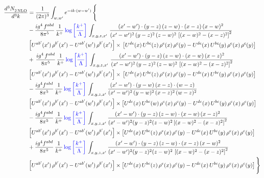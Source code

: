 \documentclass[9pt]{article}
\numberwithin{equation}{section}
\begin{document}
\begin{align}
   \frac{d^{3}N_{2\,\rm NLO}^{\rm}}{d^{3}k}  & = \frac{1}{(2\pi)^{3}}  \int_{w, w^\prime} e^{-ik\cdot (w-w')}\, \Bigg\{\notag \\ &  -\frac{ig^{4}\, f^{abd}}{8\pi^{5}}\, \frac{1}{k^{+}}\,{\color{blue}\log{\left[\frac{k^{+}}{\Lambda}\right]}}\, \int_{x,y,z,x'}\,\frac{(x'-w')\cdot  (y-z)\, (z-w)\cdot (x-z)\, (x-w)^{2}}{(x'-w')^{2}\, (y-z)^{2}\, (z-w)^{2}\,\left[(x-w)^{2}-(x-z)^{2}\right]^{2}}\, \notag \\ & \left[U^{ab'}(x')\,\rho^{b'}(x')-U^{ab'}(w')\, \rho^{b'}(x')\right]\times\,\left[U^{de}(x)\,U^{bc}(z)\, \rho^{e}(x)\,\rho^{c}(y)-U^{de}(x)\,U^{bc}(y)\,\rho^{e}(x)\,\rho^{c}(y)\right]\notag \\ &   +\, \frac{ig^{4}\, f^{abd}}{8\pi^{5}}\, \frac{1}{k^{+}}\,{\color{blue}\log{\left[\frac{k^{+}}{\Lambda}\right]}}\, \int_{x,y,z,x'}\,\frac{(x'-w')\cdot  (y-z)\, (z-w)\cdot (x-w)\, (x-z)^{2}}{(x'-w')^{2}\, (y-z)^{2}\, (z-w)^{2}\,\left[(x-w)^{2}-(x-z)^{2}\right]^{2}}\, \notag \\ & \left[U^{ab'}(x')\,\rho^{b'}(x')-U^{ab'}(w')\, \rho^{b'}(x')\right]\times\,\left[U^{de}(x)\,U^{bc}(z)\, \rho^{e}(x)\,\rho^{c}(y)-U^{de}(x)\,U^{bc}(y)\,\rho^{e}(x)\,\rho^{c}(y)\right]\notag \\ & -\frac{ig^{4}f^{abd}}{8\pi^{5}}\,\frac{1}{k^{+}}\,{\color{blue}\log{\left[\frac{k^{+}}{\Lambda}\right]}}\,\int_{x,y,z,x'}
\frac{(x'-w')\cdot (y-w)\, (x-z)\cdot (w-z)}{(x'-w')^{2}\, (y-w)^{2}\, (x-z)^{2}\, (w-z)^{2}}\notag \\ & \left[U^{ab'}(x')\,\rho^{b'}(x')-U^{ab'}(w')\, \rho^{b'}(x')\right]\times \left[U^{de}(x)\,U^{bc}(w)\, \rho^{e}(x)\,\rho^{c}(y)-U^{de}(x)\,U^{bc}(y)\,\rho^{e}(x)\,\rho^{c}(y)\right]\notag \\ & -\frac{ig^{4}f^{abd}}{8\pi^{5}}\,\frac{1}{k^{+}}\,{\color{blue}\log{\left[\frac{k^{+}}{\Lambda}\right]}}\,\int_{x,y,z,x'}
\frac{(x'-w')\cdot(y-z)\,(z-w)\cdot(x-w)\,(x-z)^{2}}{(x'-w')^{2}(y-z)^{2}(z-w)^{2}\left[(x-w)^{2}-(x-z)^{2}\right]^{2}}\notag \\ & \left[U^{ab'}(x')\,\rho^{b'}(x')-U^{ab'}(w')\, \rho^{b'}(x')\right]\times \left[U^{de}(x)\,U^{bc}(z)\, \rho^{e}(x)\,\rho^{c}(y)-U^{de}(x)\,U^{bc}(y)\,\rho^{e}(x)\,\rho^{c}(y)\right]\notag \\ & +\frac{ig^{4}f^{abd}}{8\pi^{5}}\,\frac{1}{k^{+}}\,{\color{blue}\log{\left[\frac{k^{+}}{\Lambda}\right]}}\,\int_{x,y,z,x'}
\frac{(x'-w')\cdot(y-z)\,(z-w)\cdot(x-z)\,(x-w)^{2}}{(x'-w')^{2}(y-z)^{2}(z-w)^{2}\,\left[(x-w)^{2}-(x-z)^{2}\right]^{2}}\notag \\ & \left[U^{ab'}(x')\,\rho^{b'}(x')-U^{ab'}(w')\, \rho^{b'}(x')\right]\times \left[U^{de}(x)\,U^{bc}(z)\, \rho^{e}(x)\,\rho^{c}(y)-U^{de}(x)\,U^{bc}(y)\,\rho^{e}(x)\,\rho^{c}(y)\right]\Bigg\} 
\end{align}   
\end{document}
